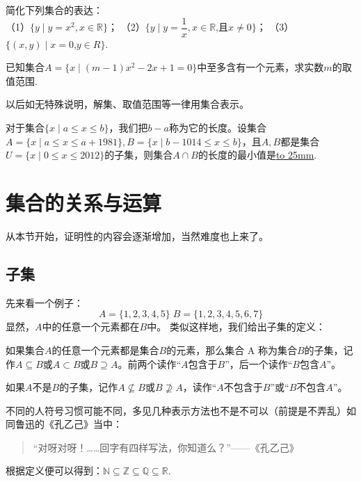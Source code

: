 \documentclass[lang=cn,math=cm,chinesefont=nofont,11pt,scheme=chinese,onecol]{elegantbook}
\begin{document}
\begin{exercise}\label{exer:8}
  简化下列集合的表达：\\
  （1）$\{y\mid y=x^2,x\in\mathbb{R}\}$；
  （2）$\{y\mid y=\dfrac{1}{x},x\in\mathbb{R}\text{,且}x\neq0\}$；
  （3）$\{(x,y)\mid x=0\text{,}y\in R\}$.
\end{exercise}

\begin{exercise}\label{exer:9}
  已知集合$A=\{x\mid(m-1)x^2-2x+1=0\}$中至多含有一个元素，求实数$m$的取值范围.
\end{exercise}
\begin{remark}
  以后如无特殊说明，解集、取值范围等一律用集合表示。
\end{remark}

\begin{exercise}\label{exer:202406261951}
  对于集合$\{x\mid a\leq x\leq b\}$，我们把$b-a$称为它的长度。设集合$A=\{x\mid a\leq x\leq a+1981\},B=\{x\mid b-1014\leq x\leq b\}$，且$A,B$都是集合$U=\{x\mid 0\leq x\leq 2012\}$的子集，则集合$A\cap B$的长度的最小值是\underline{\hbox to 25mm{}}.
\end{exercise}

\section{集合的关系与运算}
从本节开始，证明性的内容会逐渐增加，当然难度也上来了。
\subsection{子集}
先来看一个例子：$$A=\{1,2,3,4,5\}\;B=\{1,2,3,4,5,6,7\}$$
显然，$A$中的任意一个元素都在$B$中。
类似这样地，我们给出子集的定义：
\begin{definition}[子集]
  如果集合$A$的任意一个元素都是集合$B$的元素，那么集合 A 称为集合$B$的子集，记作$A\subseteq B$或$A\subset B$或$B\supseteq A$。前两个读作“$A$包含于$B$”，后一个读作“$B$包含$A$”。

  如果$A$不是$B$的子集，记作$A\nsubseteq B$或$B\nsupseteq A$，读作“$A$不包含于$B$”或“$B$不包含$A$”。
\end{definition}
不同的人符号习惯可能不同，多见几种表示方法也不是不可以（前提是不弄乱）如同鲁迅的《孔乙己》当中：
\begin{quotation}
  “对呀对呀！……回字有四样写法，你知道么？”——《孔乙己》
\end{quotation}

根据定义便可以得到：$\mathbb{N}\subseteq\mathbb{Z}\subseteq\mathbb{Q}\subseteq\mathbb{R}$.
\end{document}
